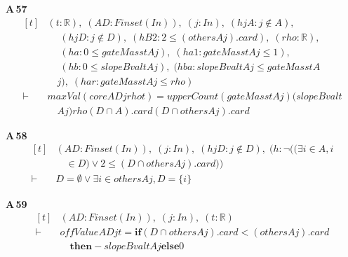 \noindent\textbf{A\,57}\quad{}
{\footnotesize\[ \begin{aligned}[t]
&(\mathit{t} : \mathbb{R} ),\; (\mathit{A} \mathit{D} : \mathit{Finset} (\mathit{I} \mathit{n})),\; (\mathit{j} : \mathit{I} \mathit{n}),\; (\mathit{hjA} : \mathit{j} \notin \mathit{A}),\\
&\quad \; (\mathit{hjD} : \mathit{j} \notin \mathit{D}),\; (\mathit{hB2} : 2 \leq (\mathit{others} \mathit{A} \mathit{j}).\mathit{card}),\; (\mathit{rho} : \mathbb{R} ),\\
&\quad \; (\mathit{ha} : 0 \leq \mathit{gateMass} \mathit{t} \mathit{A} \mathit{j}),\; (\mathit{ha1} : \mathit{gateMass} \mathit{t} \mathit{A} \mathit{j} \leq 1),\\
&\quad \; (\mathit{hb} : 0 \leq \mathit{slopeBval} \mathit{t} \mathit{A} \mathit{j}),\; (\mathit{hba} : \mathit{slopeBval} \mathit{t} \mathit{A} \mathit{j} \leq \mathit{gateMass} \mathit{t} \mathit{A}\\
&\quad \mathit{j}),\; (\mathit{har} : \mathit{gateMass} \mathit{t} \mathit{A} \mathit{j} \leq \mathit{rho})\\
\vdash\;&\mathit{maxVal} (\mathit{core} \mathit{A} \mathit{D} \mathit{j} \mathit{rho} \mathit{t}) = \mathit{upperCount} (\mathit{gateMass} \mathit{t} \mathit{A} \mathit{j}) (\mathit{slopeBval} \mathit{t}\\
&\quad \mathit{A} \mathit{j}) \mathit{rho} (\mathit{D} \cap \mathit{A}).\mathit{card} (\mathit{D} \cap \mathit{others} \mathit{A} \mathit{j}).\mathit{card}
\end{aligned} \]}

\noindent\textbf{A\,58}\quad{}
{\footnotesize\[ \begin{aligned}[t]
&(\mathit{A} \mathit{D} : \mathit{Finset} (\mathit{I} \mathit{n})),\; (\mathit{j} : \mathit{I} \mathit{n}),\; (\mathit{hjD} : \mathit{j} \notin \mathit{D}),\; (\mathit{h} : \neg ((\exists \mathit{i} \in \mathit{A}, \mathit{i}\\
&\quad \in \mathit{D}) \vee 2 \leq (\mathit{D} \cap \mathit{others} \mathit{A} \mathit{j}).\mathit{card}))\\
\vdash\;&\mathit{D} = \emptyset \vee \exists \mathit{i} \in \mathit{others} \mathit{A} \mathit{j}, \mathit{D} = \{ \mathit{i}\}
\end{aligned} \]}

\noindent\textbf{A\,59}\quad{}
{\footnotesize\[ \begin{aligned}[t]
&(\mathit{A} \mathit{D} : \mathit{Finset} (\mathit{I} \mathit{n})),\; (\mathit{j} : \mathit{I} \mathit{n}),\; (\mathit{t} : \mathbb{R} )\\
\vdash\;&\mathit{offValue} \mathit{A} \mathit{D} \mathit{j} \mathit{t} = \mathbf{if} (\mathit{D} \cap \mathit{others} \mathit{A} \mathit{j}).\mathit{card} < (\mathit{others} \mathit{A} \mathit{j}).\mathit{card}\\
&\quad \mathbf{then} -\mathit{slopeBval} \mathit{t} \mathit{A} \mathit{j} \mathbf{else} 0
\end{aligned} \]}

